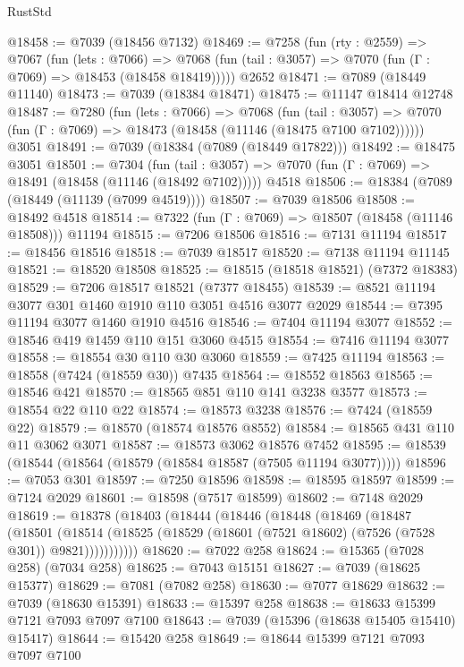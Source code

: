 \begin{lexlean}{RustStd}
\begin{coremodule}
@18458 := @7039 (@18456 @7132)
@18469 := @7258
    (fun (rty : @2559) =>
    @7067
      (fun (lets : @7066) =>
      @7068 (fun (tail : @3057) => @7070 (fun (Γ : @7069) => @18453 (@18458 @18419)))))
    @2652
@18471 := @7089 (@18449 @11140)
@18473 := @7039 (@18384 @18471)
@18475 := @11147 @18414 @12748
@18487 := @7280
    (fun (lets : @7066) =>
    @7068
      (fun (tail : @3057) =>
      @7070 (fun (Γ : @7069) => @18473 (@18458 (@11146 (@18475 @7100 @7102))))))
    @3051
@18491 := @7039 (@18384 (@7089 (@18449 @17822)))
@18492 := @18475 @3051
@18501 := @7304
    (fun (tail : @3057) => @7070 (fun (Γ : @7069) => @18491 (@18458 (@11146 (@18492 @7102)))))
    @4518
@18506 := @18384 (@7089 (@18449 (@11139 (@7099 @4519))))
@18507 := @7039 @18506
@18508 := @18492 @4518
@18514 := @7322 (fun (Γ : @7069) => @18507 (@18458 (@11146 @18508))) @11194
@18515 := @7206 @18506
@18516 := @7131 @11194
@18517 := @18456 @18516
@18518 := @7039 @18517
@18520 := @7138 @11194 @11145
@18521 := @18520 @18508
@18525 := @18515 (@18518 @18521) (@7372 @18383)
@18529 := @7206 @18517 @18521 (@7377 @18455)
@18539 := @8521 @11194 @3077 @301 @1460 @1910 @110 @3051 @4516 @3077 @2029
@18544 := @7395 @11194 @3077 @1460 @1910 @4516
@18546 := @7404 @11194 @3077
@18552 := @18546 @419 @1459 @110 @151 @3060 @4515
@18554 := @7416 @11194 @3077
@18558 := @18554 @30 @110 @30 @3060
@18559 := @7425 @11194
@18563 := @18558 (@7424 (@18559 @30)) @7435
@18564 := @18552 @18563
@18565 := @18546 @421
@18570 := @18565 @851 @110 @141 @3238 @3577
@18573 := @18554 @22 @110 @22
@18574 := @18573 @3238
@18576 := @7424 (@18559 @22)
@18579 := @18570 (@18574 @18576 @8552)
@18584 := @18565 @431 @110 @11 @3062 @3071
@18587 := @18573 @3062 @18576 @7452
@18595 := @18539 (@18544 (@18564 (@18579 (@18584 @18587 (@7505 @11194 @3077)))))
@18596 := @7053 @301
@18597 := @7250 @18596
@18598 := @18595 @18597
@18599 := @7124 @2029
@18601 := @18598 (@7517 @18599)
@18602 := @7148 @2029
@18619 := @18378
    (@18403
      (@18444
        (@18446
          (@18448
            (@18469
              (@18487
                (@18501
                  (@18514
                    (@18525 (@18529 (@18601 (@7521 @18602) (@7526 (@7528 @301)) @9821)))))))))))
@18620 := @7022 @258
@18624 := @15365 (@7028 @258) (@7034 @258)
@18625 := @7043 @15151
@18627 := @7039 (@18625 @15377)
@18629 := @7081 (@7082 @258)
@18630 := @7077 @18629
@18632 := @7039 (@18630 @15391)
@18633 := @15397 @258
@18638 := @18633 @15399 @7121 @7093 @7097 @7100
@18643 := @7039 (@15396 (@18638 @15405 @15410) @15417)
@18644 := @15420 @258
@18649 := @18644 @15399 @7121 @7093 @7097 @7100

\end{coremodule}
\end{lexlean}

